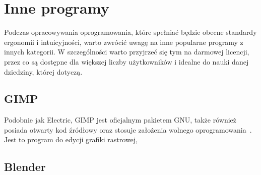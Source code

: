 \section{Inne programy}

Podczas opracowywania oprogramowania,
które spełniać będzie obecne standardy ergonomii i intuicyjności,
warto zwrócić uwagę na inne popularne programy z innych kategorii.
W szczególności warto przyjrzeć się tym na darmowej licencji,
przez co są dostępne dla większej liczby użytkowników
i idealne do nauki danej dziedziny, której dotyczą.

\subsection{GIMP}

Podobnie jak Electric, GIMP jest oficjalnym pakietem GNU, także również posiada otwarty kod źródłowy
oraz stosuje założenia wolnego oprogramowania~\cite{gimp_site}.
Jest to program do edycji grafiki rastrowej, 

\subsection{Blender}
